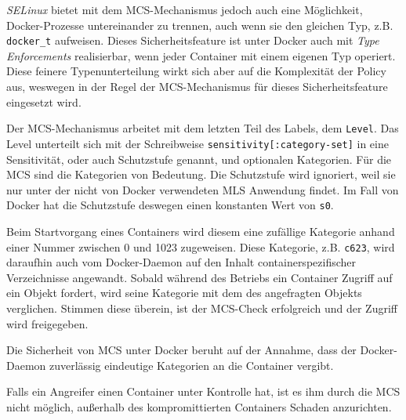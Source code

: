 \documentclass[../main.tex]{subfiles}
\begin{document}
					\emph{SELinux} bietet mit dem MCS-Mechanismus jedoch auch eine Möglichkeit, Docker-Prozesse untereinander zu trennen, auch wenn sie den gleichen Typ, z.B. \texttt{docker\_t} aufweisen. Dieses Sicherheitsfeature ist unter Docker auch mit \emph{Type Enforcements} realisierbar, wenn jeder Container mit einem eigenen Typ operiert. Diese feinere Typenunterteilung wirkt sich aber auf die Komplexität der Policy aus, weswegen in der Regel der MCS-Mechanismus für dieses Sicherheitsfeature eingesetzt wird.

					Der MCS-Mechanismus arbeitet mit dem letzten Teil des Labels, dem \texttt{Level}. Das Level unterteilt sich mit der Schreibweise \texttt{sensitivity[:category-set]} in eine Sensitivität, oder auch Schutzstufe genannt, und optionalen Kategorien. Für die MCS sind die Kategorien von Bedeutung. Die Schutzstufe wird ignoriert, weil sie nur unter der nicht von Docker verwendeten \acrshort{MLS} Anwendung findet. Im Fall von Docker hat die Schutzstufe deswegen einen konstanten Wert von \texttt{s0}.

					Beim Startvorgang eines Containers wird diesem eine zufällige Kategorie anhand einer Nummer zwischen 0 und 1023 zugeweisen. Diese Kategorie, z.B. \texttt{c623}, wird daraufhin auch vom Docker-Daemon auf den Inhalt containerspezifischer Verzeichnisse angewandt. Sobald während des Betriebs ein Container Zugriff auf ein Objekt fordert, wird seine Kategorie mit dem des angefragten Objekts verglichen. Stimmen diese überein, ist der MCS-Check erfolgreich und der Zugriff wird freigegeben.

					Die Sicherheit von MCS unter Docker beruht auf der Annahme, dass der Docker-Daemon zuverlässig eindeutige Kategorien an die Container vergibt.

					Falls ein Angreifer einen Container unter Kontrolle hat, ist es ihm durch die MCS nicht möglich, außerhalb des kompromittierten Containers Schaden anzurichten.
\end{document}

